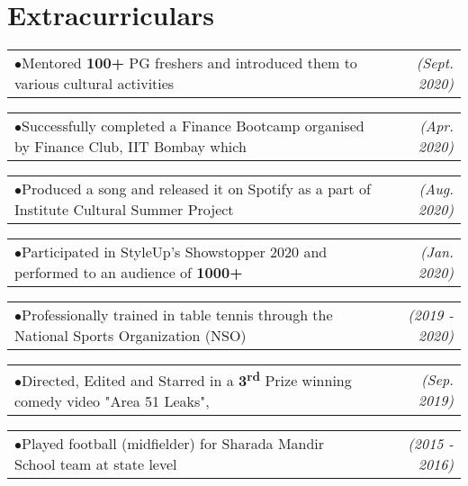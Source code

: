 \documentclass[a4paper,11pt]{article}
\makeatletter
\newcommand{\extracurr}[2]{
    \begin{tabular*}{0.977\textwidth}{l@{\extracolsep{\fill}}r}
        \tiny{$\bullet$}\hspace{7pt}\small{#1} & \textit{\small{#2}} \\
    \end{tabular*}\vspace{-11pt}
}
\makeatother
\begin{document}
  \section{Extracurriculars}
    \begin{adjustwidth}{10.8pt}{}
      \extracurr{Mentored \textbf{100+} PG freshers and introduced them to various cultural activities}{(Sept. 2020)}
      
      \extracurr{Successfully completed a Finance Bootcamp organised by Finance Club, IIT Bombay which}{(Apr. 2020)}
      
      \vspace{-2pt} \hspace{3.75mm}{\small taught and tested the knowledge of Financial Statements, Capital Markets \& Ratio Analysis}
      
      \vspace{2pt}
      \extracurr{Produced a song and released it on Spotify as a part of Institute Cultural Summer Project}{(Aug. 2020)}
      
      \extracurr{Participated in StyleUp's Showstopper 2020 and performed to an audience of \textbf{1000+}}{(Jan. 2020)}
      
      \extracurr{Professionally trained in table tennis through the National Sports Organization (NSO)} {(2019 - 2020)}
      
      \extracurr{Directed, Edited and Starred in a \textbf{3\textsuperscript{rd}} Prize winning comedy video "Area 51 Leaks",}{(Sep. 2019)}
      
      \vspace{-2pt} \hspace{3.75mm}{made as an entry for freshmen festival - Freshiezza}
      
      \vspace{2pt}
      \extracurr{Played football (midfielder) for Sharada Mandir School team at state level}{(2015 - 2016)}
    
    \end{adjustwidth}
\end{document}

